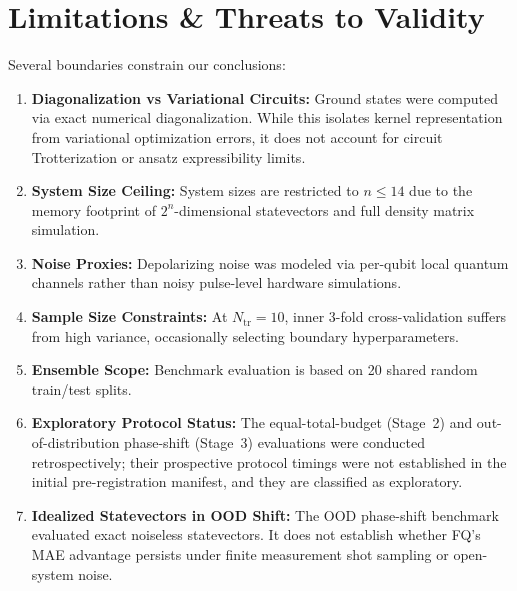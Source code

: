 \documentclass[conference]{IEEEtran}
\begin{document}
\section{Limitations \& Threats to Validity}
Several boundaries constrain our conclusions:
\begin{enumerate}
    \item \textbf{Diagonalization vs Variational Circuits:} Ground states were computed via exact numerical diagonalization. While this isolates kernel representation from variational optimization errors, it does not account for circuit Trotterization or ansatz expressibility limits.
    \item \textbf{System Size Ceiling:} System sizes are restricted to $n \le 14$ due to the memory footprint of $2^n$-dimensional statevectors and full density matrix simulation.
    \item \textbf{Noise Proxies:} Depolarizing noise was modeled via per-qubit local quantum channels rather than noisy pulse-level hardware simulations.
    \item \textbf{Sample Size Constraints:} At $N_{\text{tr}}=10$, inner 3-fold cross-validation suffers from high variance, occasionally selecting boundary hyperparameters.
    \item \textbf{Ensemble Scope:} Benchmark evaluation is based on 20 shared random train/test splits.
    \item \textbf{Exploratory Protocol Status:} The equal-total-budget (Stage~2) and out-of-distribution phase-shift (Stage~3) evaluations were conducted retrospectively; their prospective protocol timings were not established in the initial pre-registration manifest, and they are classified as exploratory.
    \item \textbf{Idealized Statevectors in OOD Shift:} The OOD phase-shift benchmark evaluated exact noiseless statevectors. It does not establish whether FQ's MAE advantage persists under finite measurement shot sampling or open-system noise.
\end{enumerate}
\end{document}
